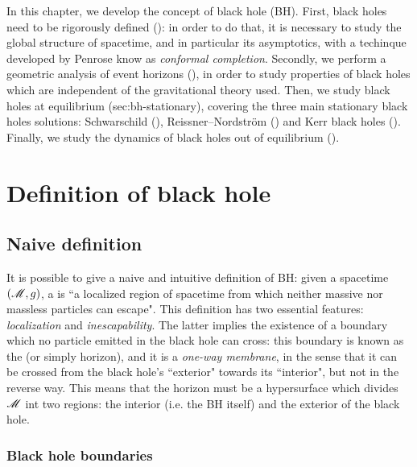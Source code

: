 
In this chapter, we develop the concept of black hole (BH). First, black holes need to be rigorously defined (): in order to do that, it is necessary to study the global structure of spacetime, and in particular its asymptotics, with a techinque developed by Penrose \cite{penrose-1, penrose-2} know as \emph{conformal completion}. Secondly, we perform a geometric analysis of event horizons (), in order to study properties of black holes which are independent of the gravitational theory used. Then, we study black holes at equilibrium (sec:bh-stationary), covering the three main stationary black holes solutions: Schwarschild (), Reissner--Nordström () and Kerr black holes (). Finally, we study the dynamics of black holes out of equilibrium ().

\section{Definition of black hole}
\label{sec:bh-def}

\subsection{Naive definition}

It is possible to give a naive and intuitive definition of BH: given a spacetime $ (\mathscr{M} , g) $, a  is ``a localized region of spacetime from which neither massive nor massless particles can escape". This definition has two essential features: \emph{localization} and \emph{inescapability}. The latter implies the existence of a boundary which no particle emitted in the black hole can cross: this boundary is known as the  (or simply horizon), and it is a \emph{one-way membrane}, in the sense that it can be crossed from the black hole's ``exterior" towards its ``interior", but not in the reverse way. This means that the horizon must be a hypersurface which divides $ \mathscr{M} $ int two regions: the interior (i.e. the BH itself) and the exterior of the black hole.

\subsubsection{Black hole boundaries}
\label{sssec:bh-boundaries}

